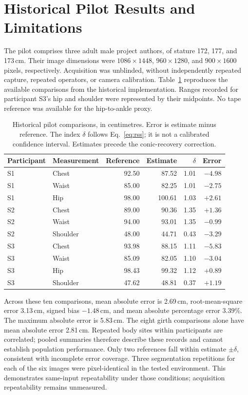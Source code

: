 \documentclass[11pt,a4paper]{article}
\begin{document}
\section{Historical Pilot Results and Limitations}
The pilot comprises three adult male project authors, of stature 172, 177, and 173\,cm. Their image dimensions were $1086\times1448$, $960\times1280$, and $900\times1600$ pixels, respectively. Acquisition was unblinded, without independently repeated capture, repeated operators, or camera calibration. Table~\ref{tab:pilot} reproduces the available comparisons from the historical implementation. Ranges recorded for participant S3's hip and shoulder were represented by their midpoints. No tape reference was available for the hip-to-ankle proxy.

\begin{table}[htbp]
\centering
\caption{Historical pilot comparisons, in centimetres. Error is estimate minus reference. The index $\delta$ follows Eq.~\eqref{eq:rss}; it is not a calibrated confidence interval. Estimates precede the conic-recovery correction.}
\label{tab:pilot}
\small
\begin{tabular}{llrrrr}
\toprule
Participant & Measurement & Reference & Estimate & $\delta$ & Error\\
\midrule
S1 & Chest    & 92.50 & 87.52 & 1.01 & $-4.98$\\
S1 & Waist    & 85.00 & 82.25 & 1.01 & $-2.75$\\
S1 & Hip      & 98.00 &100.61 & 1.03 & $+2.61$\\
S2 & Chest    & 89.00 & 90.36 & 1.35 & $+1.36$\\
S2 & Waist    & 94.00 & 93.01 & 1.35 & $-0.99$\\
S2 & Shoulder & 48.00 & 44.71 & 0.43 & $-3.29$\\
S3 & Chest    & 93.98 & 88.15 & 1.11 & $-5.83$\\
S3 & Waist    & 85.09 & 82.05 & 1.10 & $-3.04$\\
S3 & Hip      & 98.43 & 99.32 & 1.12 & $+0.89$\\
S3 & Shoulder & 47.62 & 48.81 & 0.37 & $+1.19$\\
\bottomrule
\end{tabular}
\end{table}

Across these ten comparisons, mean absolute error is 2.69\,cm, root-mean-square error 3.13\,cm, signed bias $-1.48$\,cm, and mean absolute percentage error $3.39\%$. The maximum absolute error is 5.83\,cm. The eight girth comparisons alone have mean absolute error 2.81\,cm. Repeated body sites within participants are correlated; pooled summaries therefore describe these records and cannot establish population performance. Only two references fall within estimate $\pm\delta$, consistent with incomplete error coverage. Three segmentation repetitions for each of the six images were pixel-identical in the tested environment. This demonstrates same-input repeatability under those conditions; acquisition repeatability remains unmeasured.
\end{document}
